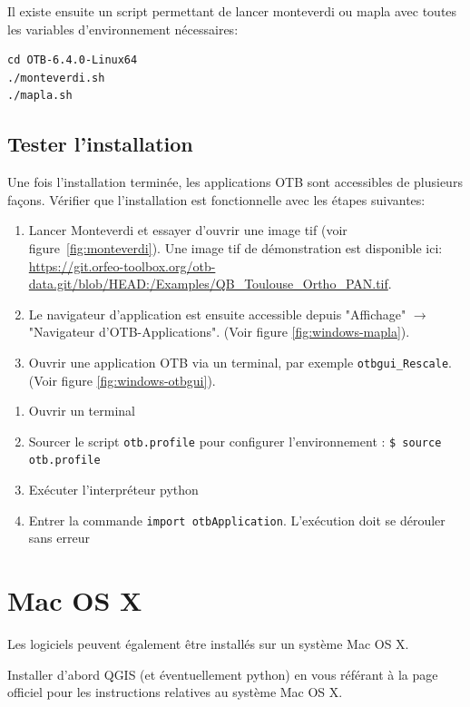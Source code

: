 \documentclass[10pt,a4paper]{article}
\begin{document}
Il existe ensuite un script permettant de lancer monteverdi ou mapla avec toutes les
variables d'environnement nécessaires:
\begin{verbatim}
cd OTB-6.4.0-Linux64
./monteverdi.sh
./mapla.sh
\end{verbatim}

\subsection{Tester l'installation}
Une fois l'installation terminée, les applications OTB sont accessibles de
plusieurs façons. Vérifier que l'installation est fonctionnelle avec les étapes
suivantes:
\begin{enumerate}

\item Lancer Monteverdi et essayer d'ouvrir une image tif (voir
figure~\ref{fig:monteverdi}). Une image tif de démonstration est disponible ici:
\url{https://git.orfeo-toolbox.org/otb-data.git/blob/HEAD:/Examples/QB\_Toulouse\_Ortho\_PAN.tif}.

\item Le navigateur d'application est ensuite accessible depuis "Affichage"
$\rightarrow$ "Navigateur d'OTB-Applications".
(Voir figure \ref{fig:windows-mapla}).

\item Ouvrir une application OTB via un terminal, par exemple
\texttt{otbgui\_Rescale}. (Voir figure \ref{fig:windows-otbgui}).

\end{enumerate}

\begin{enumerate}
 \item Ouvrir un terminal
 \item Sourcer le script \verb?otb.profile? pour configurer l'environnement : \verb?$ source otb.profile?
 \item Exécuter l'interpréteur python
 \item Entrer la commande \verb?import otbApplication?. L'exécution doit se dérouler sans erreur
\end{enumerate}


\clearpage
\section{Mac OS X}

Les logiciels peuvent également être installés sur un système Mac OS X.

Installer d'abord QGIS (et éventuellement python) en vous référant à la page officiel pour les instructions
relatives au système Mac OS X.
\end{document}
